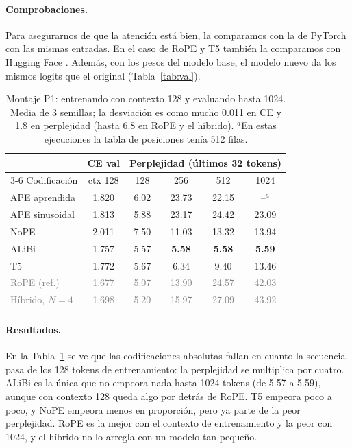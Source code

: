\documentclass[11pt]{article}
\begin{document}
\paragraph{Comprobaciones.}
Para asegurarnos de que la atención está bien, la comparamos con la de PyTorch \citep{paszke2019pytorch} con las mismas entradas. En el caso de RoPE y T5 también la comparamos con Hugging Face \citep{wolf2020transformers}.
Además, con los pesos del modelo base, el modelo nuevo da los mismos logits que el original (Tabla~\ref{tab:val}).

\begin{table}[t]
\centering\small\setlength{\tabcolsep}{2.8pt}
\begin{tabular}{@{}lccccc@{}}
\toprule
 & CE val & \multicolumn{4}{c}{Perplejidad (últimos 32 tokens)} \\
\cmidrule(l){3-6}
Codificación & ctx 128 & 128 & 256 & 512 & 1024 \\
\midrule
APE aprendida & 1.820 & 6.02 & 23.73 & 22.15 & --$^a$ \\
APE sinusoidal & 1.813 & 5.88 & 23.17 & 24.42 & 23.09 \\
NoPE & 2.011 & 7.50 & 11.03 & 13.32 & 13.94 \\
ALiBi & 1.757 & 5.57 & \textbf{5.58} & \textbf{5.58} & \textbf{5.59} \\
T5 & 1.772 & 5.67 & 6.34 & 9.40 & 13.46 \\
\midrule
\textcolor{gray}{RoPE (ref.)} & \textcolor{gray}{1.677} & \textcolor{gray}{5.07} & \textcolor{gray}{13.90} & \textcolor{gray}{24.57} & \textcolor{gray}{42.03} \\
\textcolor{gray}{Híbrido, $N{=}4$} & \textcolor{gray}{1.698} & \textcolor{gray}{5.20} & \textcolor{gray}{15.97} & \textcolor{gray}{27.09} & \textcolor{gray}{43.92} \\
\bottomrule
\end{tabular}
\caption{Montaje P1: entrenando con contexto 128 y evaluando hasta 1024. Media de 3 semillas; la desviación es como mucho 0.011 en CE y 1.8 en perplejidad (hasta 6.8 en RoPE y el híbrido). $^a$En estas ejecuciones la tabla de posiciones tenía 512 filas.}
\label{tab:pe}
\end{table}

\paragraph{Resultados.}
En la Tabla~\ref{tab:pe} se ve que las codificaciones absolutas fallan en cuanto la secuencia pasa de los 128 tokens de entrenamiento: la perplejidad se multiplica por cuatro.
ALiBi es la única que no empeora nada hasta 1024 tokens (de 5.57 a 5.59), aunque con contexto 128 queda algo por detrás de RoPE.
T5 empeora poco a poco, y NoPE empeora menos en proporción, pero ya parte de la peor perplejidad.
RoPE es la mejor con el contexto de entrenamiento y la peor con 1024, y el híbrido no lo arregla con un modelo tan pequeño.
\end{document}
